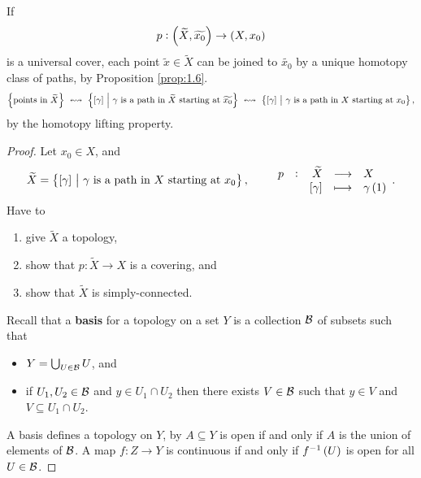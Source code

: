 \begin{remark*}
If
$$ p : \br{\widetilde{X}, \widetilde{x_0}} \to \br{X, x_0} $$
is a universal cover, each point $ \widetilde{x} \in \widetilde{X} $ can be joined to $ \widetilde{x_0} $ by a unique homotopy class of paths, by Proposition \ref{prop:1.6}.
$$ \cbr{\text{points in} \ \widetilde{X}} \ \leftrightsquigarrow \ \cbr{\sbr{\gamma} \st \gamma \ \text{is a path in} \ \widetilde{X} \ \text{starting at} \ \widetilde{x_0}} \ \leftrightsquigarrow \ \cbr{\sbr{\gamma} \st \gamma \ \text{is a path in} \ X \ \text{starting at} \ x_0}, $$
by the homotopy lifting property.
\end{remark*}

\begin{proof}
Let $ x_0 \in X $, and
$$ \widetilde{X} = \cbr{\sbr{\gamma} \st \gamma \ \text{is a path in} \ X \ \text{starting at} \ x_0}, \qquad \function[p]{\widetilde{X}}{X}{\sbr{\gamma}}{\gamma\br{1}}. $$
Have to
\begin{enumerate}
\item give $ \widetilde{X} $ a topology,
\item show that $ p : \widetilde{X} \to X $ is a covering, and
\item show that $ \widetilde{X} $ is simply-connected.
\end{enumerate}
Recall that a \textbf{basis} for a topology on a set $ Y $ is a collection $ \mathcal{B} $ of subsets such that
\begin{itemize}
\item $ Y = \bigcup_{U \in \mathcal{B}} U $, and
\item if $ U_1, U_2 \in \mathcal{B} $ and $ y \in U_1 \cap U_2 $ then there exists $ V \in \mathcal{B} $ such that $ y \in V $ and $ V \subseteq U_1 \cap U_2 $.
\end{itemize}
A basis defines a topology on $ Y $, by $ A \subseteq Y $ is open if and only if $ A $ is the union of elements of $ \mathcal{B} $. A map $ f : Z \to Y $ is continuous if and only if $ f^{-1}\br{U} $ is open for all $ U \in \mathcal{B} $.

\pagebreak


\end{proof}
